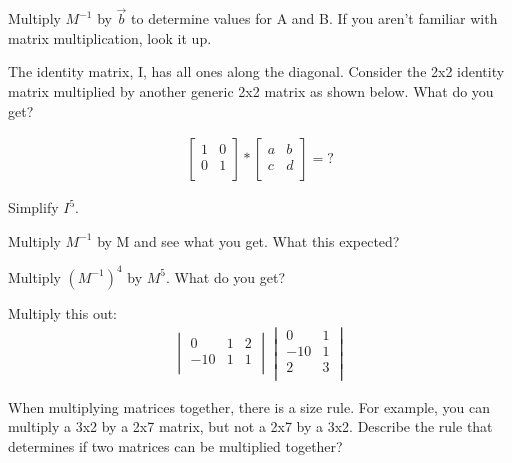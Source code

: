 \begin{blevel}
Multiply $M^{-1}$ by $\vec{b}$ to determine values for A and B. If you aren't familiar with matrix multiplication, look it up.
\end{blevel}

\begin{blevel}
The identity matrix, I, has all ones along the diagonal. Consider the 2x2 identity matrix multiplied by another generic 2x2 matrix as shown below. What do you get?

\begin{align*}
\left[ \begin{matrix}
1 &	0\\
0&	1 \\
\end{matrix} \right]*\left[ \begin{matrix}
a &	b\\
c&	d \\
\end{matrix} \right]=?
\end{align*} 
\end{blevel}

\begin{blevel}
Simplify $I^{5}$.
\end{blevel}

\begin{blevel}
Multiply $M^{-1}$ by M and see what you get. What this expected?
\end{blevel}

\begin{blevel}
Multiply $(M^{-1})^4$ by $M^5$. What do you get?
\end{blevel}

\begin{blevel}
Multiply this out:
\begin{align*}
\begin{vmatrix}0 &	1&2\\-10&1	&1 \\\end{vmatrix}
\begin{vmatrix}0 &	1\\-10&1\\ 2&3\\ \end{vmatrix}
\end{align*}
\end{blevel}

\begin{clevel}
When multiplying matrices together, there is a size rule. For example, you can multiply a 3x2 by a 2x7 matrix, but not a 2x7 by a 3x2. Describe the rule that determines if two matrices can be multiplied together?
\end{clevel}

